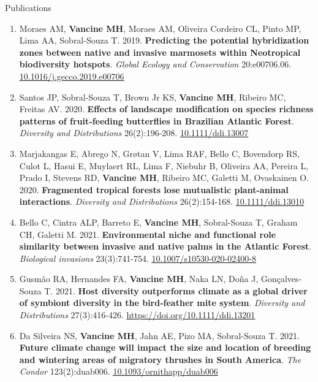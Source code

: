 \documentclass{resume}
\begin{document}
\begin{rSection}{Publications}
\begin{enumerate}
\item Moraes AM, {\bf Vancine MH}, Moraes AM, Oliveira Cordeiro CL, Pinto MP, Lima AA, Sobral-Souza T. 2019. {\bf Predicting the potential hybridization zones between native and invasive marmosets within Neotropical biodiversity hotspots}. {\it Global Ecology and Conservation} 20:e00706.06. \href{https://doi.org/10.1016/j.gecco.2019.e00706}{\underline{10.1016/j.gecco.2019.e00706}}

\item Santos JP, Sobral‐Souza T, Brown Jr KS, {\bf Vancine MH}, Ribeiro MC, Freitas AV. 2020. {\bf Effects of landscape modification on species richness patterns of fruit‐feeding butterflies in Brazilian Atlantic Forest}. {\it Diversity and Distributions} 26(2):196-208. \href{https://doi.org/10.1111/ddi.13007}{\underline{10.1111/ddi.13007}}

\item Marjakangas E, Abrego N, Grøtan V, Lima RAF, Bello C, Bovendorp RS, Culot L, Hasui E, Muylaert RL, Lima F, Niebuhr B, Oliveira AA, Pereira L, Prado I, Stevens RD, {\bf Vancine MH}, Ribeiro MC, Galetti M, Ovaskainen O. 2020. {\bf Fragmented tropical forests lose mutualistic plant-animal interactions}. {\it Diversity and Distributions} 26(2):154-168. \href{https://doi.org/10.1111/ddi.13010}{\underline{10.1111/ddi.13010}}

\item Bello C, Cintra ALP, Barreto E, {\bf Vancine MH}, Sobral-Souza T, Graham CH, Galetti M. 2021. {\bf Environmental niche and functional role similarity between invasive and native palms in the Atlantic Forest}. {\it Biological invasions} 23(3):741-754. \href{https://doi.org/10.1007/s10530-020-02400-8}{\underline{10.1007/s10530-020-02400-8}}

\item Gusmão RA, Hernandes FA, {\bf Vancine MH}, Naka LN, Doña J, Gonçalves‐Souza T. 2021. {\bf Host diversity outperforms climate as a global driver of symbiont diversity in the bird‐feather mite system}. {\it Diversity and Distributions} 27(3):416-426. \href{https://doi.org/10.1111/ddi.13201}{\underline{https://doi.org/10.1111/ddi.13201}}

\item Da Silveira NS, {\bf Vancine MH}, Jahn AE, Pizo MA, Sobral-Souza T. 2021. {\bf Future climate change will impact the size and location of breeding and wintering areas of migratory thrushes in South America}. {\it The Condor} 123(2):duab006. \href{https://doi.org/10.1093/ornithapp/duab006}{\underline{10.1093/ornithapp/duab006}}


\end{enumerate}
\end{rSection}
\end{document}
